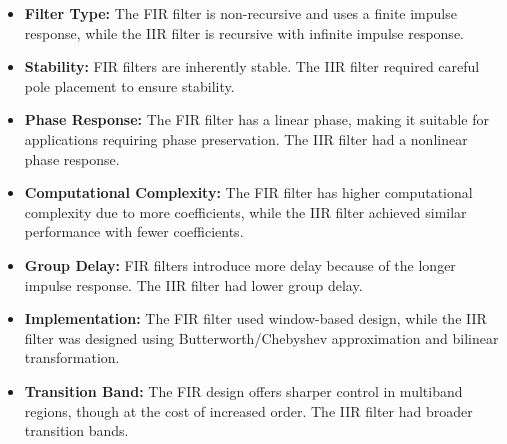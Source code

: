 \documentclass[12pt]{article}
\begin{document}
\begin{itemize}
    \item \textbf{Filter Type:} The FIR filter is non-recursive and uses a finite impulse response, while the IIR filter is recursive with infinite impulse response.
    \item \textbf{Stability:} FIR filters are inherently stable. The IIR filter required careful pole placement to ensure stability.
    \item \textbf{Phase Response:} The FIR filter has a linear phase, making it suitable for applications requiring phase preservation. The IIR filter had a nonlinear phase response.
    \item \textbf{Computational Complexity:} The FIR filter has higher computational complexity due to more coefficients, while the IIR filter achieved similar performance with fewer coefficients.
    \item \textbf{Group Delay:} FIR filters introduce more delay because of the longer impulse response. The IIR filter had lower group delay.
    \item \textbf{Implementation:} The FIR filter used window-based design, while the IIR filter was designed using Butterworth/Chebyshev approximation and bilinear transformation.
    \item \textbf{Transition Band:} The FIR design offers sharper control in multiband regions, though at the cost of increased order. The IIR filter had broader transition bands.
\end{itemize}
\end{document}
